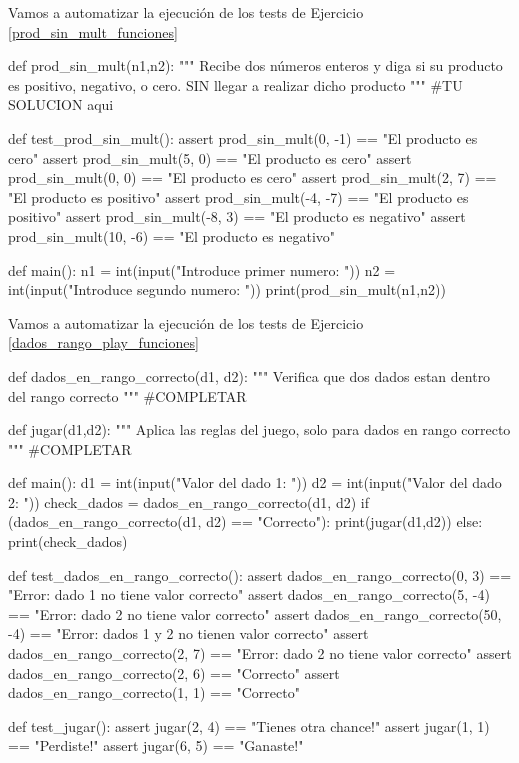 \begin{ejercicio}
Vamos a automatizar la ejecución de los tests de Ejercicio \ref{prod_sin_mult_funciones}

\begin{python}
def prod_sin_mult(n1,n2):
    """
    Recibe dos números enteros y diga si su producto es positivo, negativo, o cero.
    SIN llegar a realizar dicho producto
    """
    #TU SOLUCION aqui

def test_prod_sin_mult():
    assert prod_sin_mult(0, -1) == "El producto es cero"
    assert prod_sin_mult(5, 0) == "El producto es cero"
    assert prod_sin_mult(0, 0) == "El producto es cero"
    assert prod_sin_mult(2, 7) == "El producto es positivo"
    assert prod_sin_mult(-4, -7) == "El producto es positivo"
    assert prod_sin_mult(-8, 3) == "El producto es negativo"
    assert prod_sin_mult(10, -6) == "El producto es negativo"
    
def main():
    n1 = int(input("Introduce primer numero: "))
    n2 = int(input("Introduce segundo numero: "))
    print(prod_sin_mult(n1,n2))
\end{python}
\end{ejercicio}


\begin{ejercicio}  
Vamos a automatizar la ejecución de los tests de Ejercicio \ref{dados_rango_play_funciones}

\begin{small}
\begin{python}
def dados_en_rango_correcto(d1, d2):
    """
    Verifica que dos dados estan dentro del rango correcto
    """
    #COMPLETAR
        
def jugar(d1,d2):
    """
    Aplica las reglas del juego, solo para dados en rango correcto
    """
    #COMPLETAR
  
def main():
    d1 = int(input("Valor del dado 1: "))
    d2 = int(input("Valor del dado 2: "))
    check_dados = dados_en_rango_correcto(d1, d2)
    if (dados_en_rango_correcto(d1, d2) == "Correcto"):
        print(jugar(d1,d2))
    else:
        print(check_dados)
  

def test_dados_en_rango_correcto():
    assert dados_en_rango_correcto(0, 3) == "Error: dado 1 no tiene valor correcto"
    assert dados_en_rango_correcto(5, -4) == "Error: dado 2 no tiene valor correcto"
    assert dados_en_rango_correcto(50, -4) == "Error: dados 1 y 2 no tienen valor correcto"
    assert dados_en_rango_correcto(2, 7) == "Error: dado 2 no tiene valor correcto"
    assert dados_en_rango_correcto(2, 6) == "Correcto"
    assert dados_en_rango_correcto(1, 1) == "Correcto"
    

def test_jugar():
    assert jugar(2, 4) == "Tienes otra chance!"
    assert jugar(1, 1) == "Perdiste!"
    assert jugar(6, 5) == "Ganaste!"    
\end{python}
\end{small}

\end{ejercicio}



